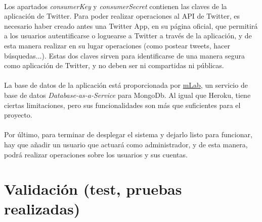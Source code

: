\documentclass[a4paper]{article}
\begin{document}
\paragraph{}Los apartados \textit{consumerKey} y \textit{consumerSecret} contienen las claves de la aplicación de Twitter. Para poder realizar operaciones al API de Twitter, es necesario haber creado antes una Twitter App, en su página oficial, que permitirá a los usuarios autentificarse o loguearse a Twitter a través de la aplicación, y de esta manera realizar en su lugar operaciones (como postear tweets, hacer búsquedas...). Estas dos claves sirven para identificarse de una manera segura como aplicación de Twitter, y no deben ser ni compartidas ni públicas.

\paragraph{}La base de datos de la aplicación está proporcionada por \href{https://mlab.com/}{mLab}, un servicio de base de datos \textit{Database-as-a-Service} para MongoDb. Al igual que Heroku, tiene ciertas limitaciones, pero sus funcionalidades son más que suficientes para el proyecto.

\paragraph{}Por último, para terminar de desplegar el sistema y dejarlo listo para funcionar, hay que añadir un usuario que actuará como administrador, y de esta manera, podrá realizar operaciones sobre los usuarios y sus cuentas.

\section{Validación (test, pruebas realizadas)}
\end{document}

